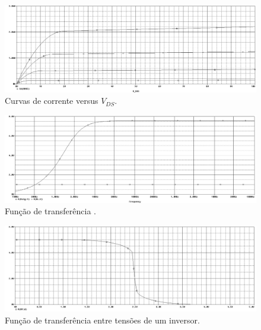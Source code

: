 \documentclass[12pt, a4paper]{article}
\begin{document}
    \newpage
    
    \begin{figure}[h!] 
        \centering
        \includegraphics[width=1\textheight, angle=-90]{graf31}
        \caption{Curvas de corrente versus \(V_{DS}\).}        
        \label{graf31}
    \end{figure}
    
    \newpage
    
    \begin{figure}[h!] 
        \centering
        \includegraphics[width=1\textheight, angle=-90]{graf32}
        \caption{Função de transferência .}        
        \label{graf32}
    \end{figure}
    
    \newpage
    
    \begin{figure}[h!] 
        \centering
        \includegraphics[width=1\textheight, angle=-90]{graf331}
        \caption{Função de transferência entre tensões de um inversor.}        
        \label{graf331}
    \end{figure}
    
\end{document}
